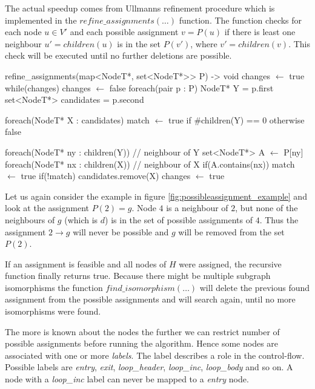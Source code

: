 The actual speedup comes from Ullmanns refinement procedure which is implemented in the $refine\_assignments(\dots)$ function. The function checks for each node $u \in V'$ and each possible assignment $v = P(u)$ if there is least one neighbour $u' = children(u)$ is in the set $P(v')$, where $v' = children(v)$. This check will be executed until no further deletions are possible.


\begin{algorithm}[mathescape, caption={Refine possible assignments}, label={alg:refine_assignments}]
refine_assignments(map<NodeT*, set<NodeT*>> P) -> void
    changes $\gets$ true
    while(changes)
        changes $\gets$ false
        foreach(pair p : P)
             NodeT* Y = p.first
             set<NodeT*> candidates = p.second
             
             foreach(NodeT* X : candidates)
                 match $\gets$ true if #children(Y) == 0 otherwise false 
                 
                 foreach(NodeT* ny : children(Y)) // neighbour of Y
                     set<NodeT*> A $\gets$ P[ny]
                     foreach(NodeT* nx : children(X)) // neighbour of X
                         if(A.contains(nx))
                             match $\gets$ true
                 if(!match)
                     candidates.remove(X)
                     changes $\gets$ true
\end{algorithm}

Let us again consider the example in figure \ref{fig:possibleassignment_example} and look at the assignment $P(2) = g$. Node $4$ is a neighbour of $2$, but none of the neighbours of $g$ (which is $d$) is in the set of possible assignments of $4$. Thus the assignment $2 \rightarrow g$ will never be possible and $g$ will be removed from the set $P(2)$.

If an assignment is feasible and all nodes of $H$ were assigned, the recursive function finally returns true. Because there might be multiple subgraph isomorphisms the function $find\_isomorphism(\dots)$ will delete the previous found assignment from the possible assignments and will search again, until no more isomorphisms were found.

The more is known about the nodes the further we can restrict number of possible assignments before running the algorithm. Hence some nodes are associated with one or more \textit{labels}. The label describes a role in the control-flow. Possible labels are \textit{entry}, \textit{exit}, \textit{loop\_header}, \textit{loop\_inc}, \textit{loop\_body} and so on. A node with a \textit{loop\_inc} label can never be mapped to a \textit{entry} node.

